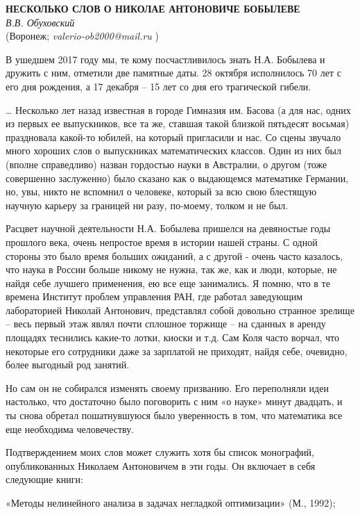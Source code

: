 \begin{center}{ \bf  НЕСКОЛЬКО СЛОВ О НИКОЛАЕ АНТОНОВИЧЕ БОБЫЛЕВЕ}\\
{\it В.В. Обуховский} \\
(Воронеж; {\it valerio-ob2000@mail.ru} )
\end{center}

В ушедшем 2017 году мы, те кому посчастливилось знать Н.А. Бобылева и дружить с ним, отметили две памятные даты. 28 октября исполнилось 70 лет с его дня рождения, а 17 декабря – 15 лет со дня его трагической гибели.

	… Несколько лет назад известная в городе Гимназия им. Басова (а для нас, одних из первых ее выпускников, все та же, ставшая такой близкой пятьдесят восьмая) праздновала какой-то юбилей, на который пригласили и нас. Со сцены звучало много хороших слов о выпускниках математических классов. Один из них был (вполне справедливо) назван гордостью науки в Австралии, о другом (тоже совершенно заслуженно) было сказано как о выдающемся математике Германии, но, увы, никто не вспомнил о человеке, который за всю свою блестящую научную карьеру за границей ни разу, по-моему, толком и не был.

	Расцвет научной деятельности Н.А. Бобылева пришелся на девяностые годы прошлого века, очень непростое время в истории нашей страны. С одной стороны это было время больших ожиданий, а с другой - очень часто казалось, что наука в России больше никому не нужна, так же, как и люди, которые, не найдя себе лучшего применения, ею все еще занимались. Я помню, что в те времена Институт проблем управления РАН, где работал заведующим лабораторией Николай Антонович, представлял собой довольно странное зрелище – весь первый этаж являл почти сплошное торжище – на сданных в аренду площадях теснились какие-то лотки, киоски и т.д. Сам Коля часто ворчал, что некоторые его сотрудники даже за зарплатой не приходят, найдя себе, очевидно, более выгодный род занятий.

	Но сам он не собирался изменять своему призванию.  Его переполняли идеи настолько, что достаточно было поговорить с ним «о науке» минут двадцать, и ты снова обретал пошатнувшуюся было уверенность в том, что математика все еще необходима человечеству.

	Подтверждением моих слов может служить хотя бы список монографий, опубликованных Николаем Антоновичем в эти годы. Он включает в себя следующие книги:

«Методы нелинейного анализа в задачах негладкой оптимизации» (М., 1992); 

